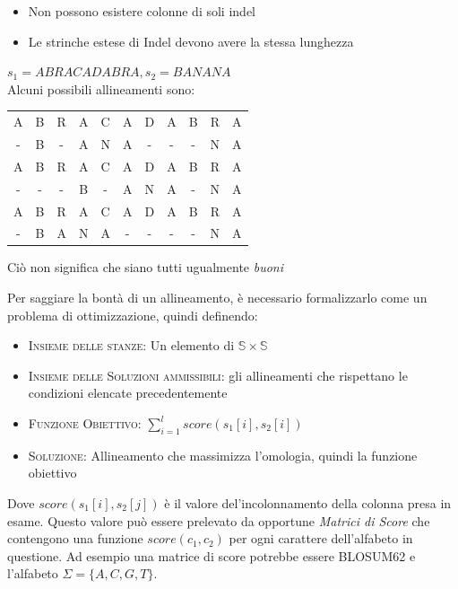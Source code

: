 \begin{itemize}
    \item Non possono esistere colonne di soli indel
    \item Le strinche estese di Indel devono avere la stessa lunghezza
    \label{itemize:indel_cond}
\end{itemize}

\begin{example}
$s_1=ABRACADABRA,s_2=BANANA$ \\
Alcuni possibili allineamenti sono:
    \begin{center}
      \begin{tabular}{ c c c c c c c c c c c}
        A & B & R & A & C & A & D & A & B & R & A \\ 
        - & B & - & A & N & A & - & - & - & N & A \\ \hline
        A & B & R & A & C & A & D & A & B & R & A \\ 
        - & - & - & B & - & A & N & A & - & N & A \\ \hline
        A & B & R & A & C & A & D & A & B & R & A \\ 
        - & B & A & N & A & - & - & - & - & N & A \\
      \end{tabular}
    \end{center}
Ciò non significa che siano tutti ugualmente \textit{buoni}
\end{example}

Per saggiare la bontà di un allineamento, è necessario formalizzarlo come un problema di ottimizzazione, quindi definendo:

\begin{itemize}
    \item \textsc{Insieme delle stanze:} Un elemento di $\mathbb{S}\times \mathbb{S}$
    \item \textsc{Insieme delle Soluzioni ammissibili:} gli allineamenti che rispettano le condizioni elencate precedentemente 
    \item \textsc{Funzione Obiettivo:} $\sum_{i=1}^{l} score(s_1[i],s_2[i])$
    \item \textsc{Soluzione:} Allineamento che massimizza l'omologia, quindi la funzione obiettivo
\end{itemize}

Dove $score(s_1[i], s_2[j])$ è il valore del'incolonnamento della colonna presa in esame. Questo valore può essere prelevato da opportune \textit{Matrici di Score} che contengono una funzione $score(c_1, c_2)$ per ogni carattere dell'alfabeto in questione. Ad esempio una matrice di score potrebbe essere \textsc{BLOSUM62} e l'alfabeto $\Sigma=\{A, C, G, T\}$.

